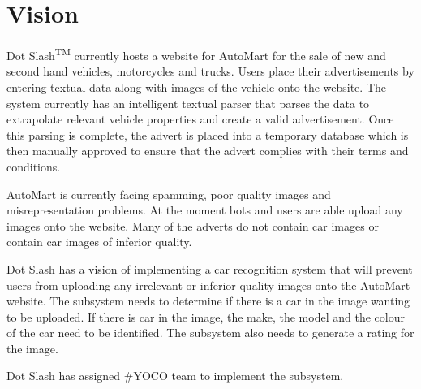 \section{Vision}
Dot Slash\textsuperscript{TM} currently hosts a website for AutoMart for the sale of new and second hand vehicles, motorcycles and trucks. Users place their advertisements by entering textual data along with images of the vehicle onto the website. The system currently has an intelligent textual parser that parses the data to extrapolate relevant vehicle properties and create a valid advertisement. Once this parsing is complete, the advert is placed into a temporary database which is then manually approved to ensure that the advert complies with their terms and conditions.

AutoMart is currently facing spamming, poor quality images and misrepresentation problems. At the moment bots and users are able upload any images onto the website. Many of the adverts do not contain car images or contain car images of inferior quality.

Dot Slash has a vision of implementing a car recognition system that will prevent users from uploading any irrelevant or inferior quality images onto the AutoMart website. The subsystem needs to determine if there is a car in the image wanting to be uploaded. If there is car in the image, the make, the model and the colour of the car need to be identified. The subsystem also needs to generate a rating for the image. 

Dot Slash has assigned \#YOCO team to implement the subsystem.
